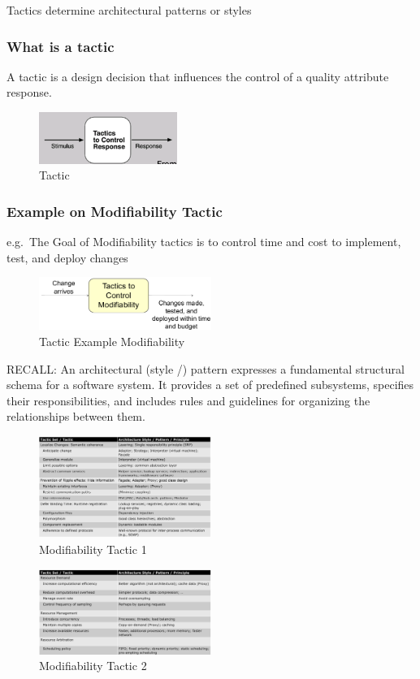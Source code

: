 Tactics determine architectural patterns or styles

\hypertarget{what-is-a-tactic}{%
\subsubsection{What is a tactic}\label{what-is-a-tactic}}

A tactic is a design decision that influences the control of a quality
attribute response.

\begin{figure}[H]
\centering
\includegraphics[width=0.4\textwidth]{figures/tactic.png}
\caption{Tactic}
\end{figure}

\hypertarget{example-on-modifiability-tactic}{%
\subsubsection{Example on Modifiability
Tactic}\label{example-on-modifiability-tactic}}

e.g.~The Goal of Modifiability tactics is to control time and cost to
implement, test, and deploy changes

\begin{figure}[H]
\centering
\includegraphics[width=0.5\textwidth]{figures/tacticExample.png}
\caption{Tactic Example Modifiability}
\end{figure}

RECALL: An architectural (style /) pattern expresses a fundamental
structural schema for a software system. It provides a set of predefined
subsystems, specifies their responsibilities, and includes rules and
guidelines for organizing the relationships between them.


\begin{figure}[H]
\centering
\includegraphics[width=0.5\textwidth]{figures/modifiabilityTactic1.png}
\caption{Modifiability Tactic 1}
\end{figure}

\begin{figure}[H]
\centering
\includegraphics[width=0.5\textwidth]{figures/modifiabilityTactic2.png}
\caption{Modifiability Tactic 2}
\end{figure}

\clearpage